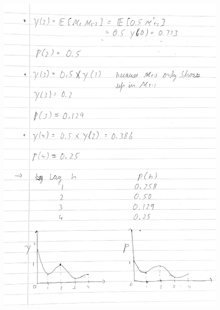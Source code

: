 \documentclass[a4paper,11pt]{article}
\begin{document}
    \begin{figure}[H]
        \centering
        \includegraphics[width=1\textwidth]{figure-markdown_strict/2-2.png}
        \label{fig:1-2}
    \end{figure}
\end{document}
